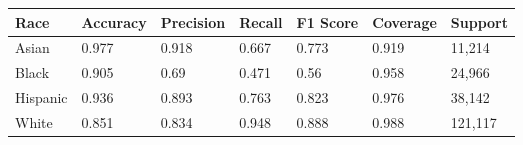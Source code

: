 \begin{tabular}{lllllll}
\toprule
Race & Accuracy & Precision & Recall & F1 Score & Coverage & Support \\
\midrule
Asian & 0.977 & 0.918 & 0.667 & 0.773 & 0.919 & 11,214 \\
Black & 0.905 & 0.69 & 0.471 & 0.56 & 0.958 & 24,966 \\
Hispanic & 0.936 & 0.893 & 0.763 & 0.823 & 0.976 & 38,142 \\
White & 0.851 & 0.834 & 0.948 & 0.888 & 0.988 & 121,117 \\
\bottomrule
\end{tabular}
